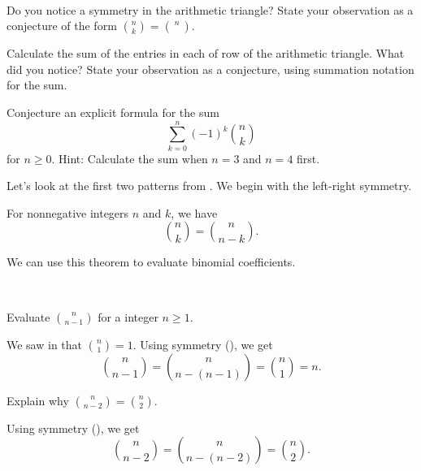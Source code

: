 \begin{act}
\label{act_pascals_patterns}
~
    \begin{exerpart}
        \item \label{part_arith_tri_sym_conj} Do you notice a symmetry in the arithmetic triangle?  State your observation as a conjecture of the form $\binom{n}{k}=\binom{n}{\quad}.$
        \item \label{part_find_row_sum_arith_tri} Calculate the sum of the entries in each of row of the arithmetic triangle. What did you notice?  State your observation as a conjecture, using summation notation for the sum.
        \item \label{part_alt_row_sum_arith_tri} Conjecture an explicit formula for the sum $$\sum_{k=0}^n(-1)^k\binom{n}{k}$$
        for $n \ge 0$.  Hint:  Calculate the sum when $n=3$ and $n=4$ first.
        \end{exerpart}
\end{act}

Let's look at the first two patterns from .  We begin with the left-right symmetry.

\begin{thm}
\label{thm_sym_arith_triangle}
    For nonnegative integers $n$ and $k$, we have
        $$\binom{n}{k} = \binom{n}{n-k}.$$
\end{thm}
We can use this theorem to evaluate binomial coefficients.

\begin{exam}
\label{exam_using_sym_arith_triangle}
~
    \begin{apart}
        \item Evaluate $\binom{n}{n-1}$ for a integer $n\ge 1$.
            \begin{soln}
                We saw in  that $\binom{n}{1}=1$.  Using symmetry (), we get
                    $$\binom{n}{n-1} = \binom{n}{n-(n-1)} = \binom{n}{1} = n.$$
            \end{soln}
        \item Explain why $\binom{n}{n-2} = \binom{n}{2}$.
            \begin{soln}
                Using symmetry (), we get
                    $$ \binom{n}{n-2} = \binom{n}{n-(n-2)}=\binom{n}{2}.$$
            \end{soln}
    \end{apart}
\end{exam}

